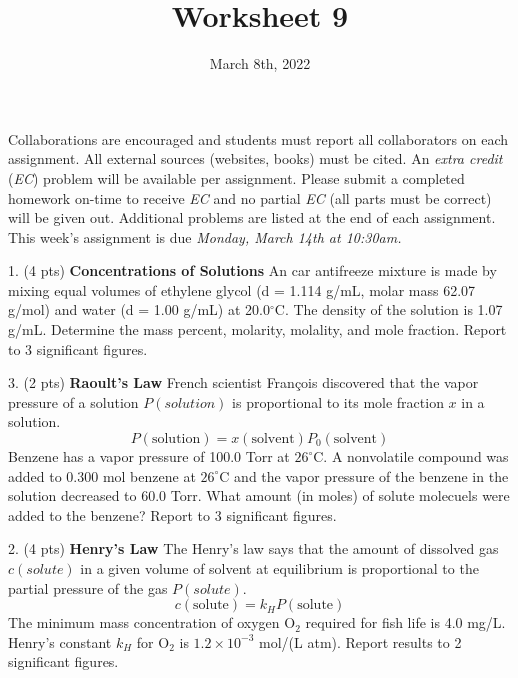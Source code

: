 \documentclass[11pt]{article}
\title{\textbf{Worksheet 9}}
\date{\vspace{-2em}March 8th, 2022}
\begin{document}
\maketitle

Collaborations are encouraged and students must report all collaborators
on each assignment. All external sources (websites, books) must be
cited. An \textit{extra credit} (\textit{EC}) problem will be available per
assignment. Please submit a completed homework on-time to receive \textit{EC}
and no partial \textit{EC} (all parts must be correct) will be given out.
Additional problems are listed at the end of each assignment. This week's
assignment is due \textit{Monday, March 14th at 10:30am.}

1. (4 pts) \textbf{Concentrations of Solutions} An car antifreeze mixture is made by mixing
equal volumes of ethylene glycol (d = 1.114 g/mL, molar mass 62.07 g/mol) and water
(d = 1.00 g/mL) at 20.0$^\circ$C. The density of the solution is 1.07 g/mL. Determine
the mass percent, molarity, molality, and mole fraction. Report to 3 significant figures.


\vspace{2in}

3. (2 pts) \textbf{Raoult's Law} French scientist Fran\c{c}ois discovered that the vapor pressure
of a solution $P(solution)$ is proportional to its mole fraction $x$ in a solution.
\begin{equation}
  P(\text{solution}) = x(\text{solvent})P_0(\text{solvent})
\end{equation}
Benzene has a vapor pressure of 100.0 Torr at $26^\circ$C. A nonvolatile compound was added
to 0.300 mol benzene at $26^\circ$C and the vapor pressure of the benzene in the solution
decreased to 60.0 Torr. What amount (in moles) of solute molecuels were added to the benzene?
Report to 3 significant figures.

\vspace{2in}

2. (4 pts) \textbf{Henry's Law} The Henry's law says that the amount of dissolved gas
$c(solute)$ in a given volume of solvent at equilibrium is proportional to the partial
pressure of the gas $P(solute)$. 
\begin{equation}
  c(\text{solute}) = k_HP(\text{solute})
\end{equation}
The minimum mass concentration of oxygen O$_2$ required for fish life is 4.0 mg/L.
Henry's constant $k_H$ for O$_2$ is $1.2\times 10^{-3}$ mol/(L atm). Report results to 2
significant figures.
\end{document}
